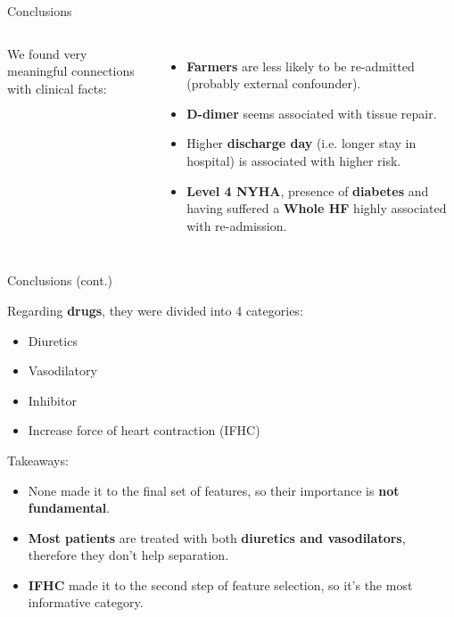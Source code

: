\documentclass[aspectratio=169,xcolor=dvipsnames,handout]{beamer}
\begin{document}
\begin{frame}{Conclusions}
\begin{columns}[c]
        We found very meaningful connections with clinical facts:
        \begin{itemize}
            \item \textbf{Farmers} are less likely to be re-admitted (probably external confounder).
            \item \textbf{D-dimer} seems associated with tissue repair.
            \item Higher \textbf{discharge day} (i.e. longer stay in hospital) is associated with higher risk.
            \item \textbf{Level 4 NYHA}, presence of \textbf{diabetes} and having suffered a \textbf{Whole HF} highly associated with re-admission.
        \end{itemize}
    \end{columns}
    
\end{frame}

\begin{frame}{Conclusions (cont.)}

    Regarding \textbf{drugs}, they were divided into 4 categories:
    \begin{itemize}
        \item Diuretics
        \item Vasodilatory
        \item Inhibitor
        \item Increase force of heart contraction (IFHC)
    \end{itemize}
    \pause
    Takeaways:
    \begin{itemize}
        \item None made it to the final set of features, so their importance is \textbf{not fundamental}.
        \pause
        \item \textbf{Most patients} are treated with both \textbf{diuretics and vasodilators}, therefore they don't help separation.
        \pause
        \item \textbf{IFHC} made it to the second step of feature selection, so it's the most informative category.
    \end{itemize}

\end{frame}
\end{document}
